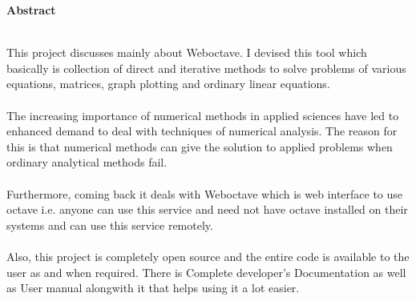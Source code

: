 \begin{center}
{\Huge \bf{Abstract}\vskip 0.2in}
\end{center}
 \hrulefill \\

This project discusses mainly about Weboctave. I devised this tool which basically is collection of direct and iterative methods to solve problems of various equations, matrices, graph plotting and ordinary linear equations.\\\\
The increasing importance of numerical methods in applied sciences have led to enhanced demand to deal with techniques of numerical analysis. The reason for this is that numerical methods can give the solution to applied problems when ordinary analytical methods fail.\\\\
Furthermore, coming back it deals with Weboctave which is web interface to use octave i.e. anyone can use this service and need not have octave installed on their systems and can use this service remotely.\\\\
Also, this project is completely open source and the entire code is available 
to the user as and when required. There is Complete developer's 
Documentation as well as User manual alongwith it that helps using it a lot easier.



